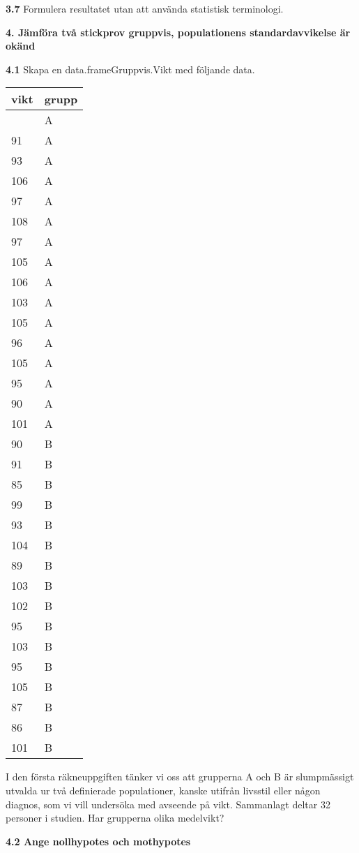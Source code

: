 \documentclass[
  letterpaper,
  DIV=11,
  numbers=noendperiod]{scrartcl}
\begin{document}
\textbf{3.7} Formulera resultatet utan att använda statistisk
terminologi.

\textbf{4. Jämföra två stickprov gruppvis, populationens
standardavvikelse är okänd}

\textbf{4.1} Skapa en data.frameGruppvis.Vikt med följande data.

\begin{longtable}[]{@{}ll@{}}
\toprule\noalign{}
vikt & grupp \\
\midrule\noalign{}
\endhead
\bottomrule\noalign{}
\endlastfoot
90 & A \\
91 & A \\
93 & A \\
106 & A \\
97 & A \\
108 & A \\
97 & A \\
105 & A \\
106 & A \\
103 & A \\
105 & A \\
96 & A \\
105 & A \\
95 & A \\
90 & A \\
101 & A \\
90 & B \\
91 & B \\
85 & B \\
99 & B \\
93 & B \\
104 & B \\
89 & B \\
103 & B \\
102 & B \\
95 & B \\
103 & B \\
95 & B \\
105 & B \\
87 & B \\
86 & B \\
101 & B \\
\end{longtable}

I den första räkneuppgiften tänker vi oss att grupperna A och B är
slumpmässigt utvalda ur två definierade populationer, kanske utifrån
livsstil eller någon diagnos, som vi vill undersöka med avseende på
vikt. Sammanlagt deltar 32 personer i studien. Har grupperna olika
medelvikt?

\textbf{4.2 Ange nollhypotes och mothypotes}
\end{document}
